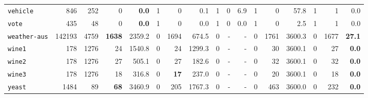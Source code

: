 \begin{tabular}{lccrrrrrrrrrrrrrr}
\texttt{vehicle} & \multicolumn{1}{r}{846} & \multicolumn{1}{r}{252}  & 0 & \textbf{0.0} & 1 & 0 & 0.1 & 1 & 0 & 6.9 & 1 & 0 & 57.8 & 1 & 1 & 0.0\\
\texttt{vote} & \multicolumn{1}{r}{435} & \multicolumn{1}{r}{48}  & 0 & \textbf{0.0} & 1 & 0 & 0.0 & 1 & 0 & 0.0 & 1 & 0 & 2.5 & 1 & 1 & 0.0\\
\texttt{weather-aus} & \multicolumn{1}{r}{142193} & \multicolumn{1}{r}{4759}  & \textbf{1638} & 2359.2 & 0 & 1694 & 674.5 & 0 & - & - & 0 & 1761 & 3600.3 & 0 & 1677 & \textbf{27.1}\\
\texttt{wine1} & \multicolumn{1}{r}{178} & \multicolumn{1}{r}{1276}  & 24 & 1540.8 & 0 & 24 & 1299.3 & 0 & - & - & 0 & 30 & 3600.1 & 0 & 27 & \textbf{0.0}\\
\texttt{wine2} & \multicolumn{1}{r}{178} & \multicolumn{1}{r}{1276}  & 27 & 505.1 & 0 & 27 & 182.6 & 0 & - & - & 0 & 32 & 3600.1 & 0 & 32 & \textbf{0.0}\\
\texttt{wine3} & \multicolumn{1}{r}{178} & \multicolumn{1}{r}{1276}  & 18 & 316.8 & 0 & \textbf{17} & 237.0 & 0 & - & - & 0 & 20 & 3600.1 & 0 & 18 & \textbf{0.0}\\
\texttt{yeast} & \multicolumn{1}{r}{1484} & \multicolumn{1}{r}{89}  & \textbf{68} & 3460.9 & 0 & 205 & 1767.3 & 0 & - & - & 0 & 463 & 3600.0 & 0 & 232 & \textbf{0.0}\\
\bottomrule
\end{tabular}
